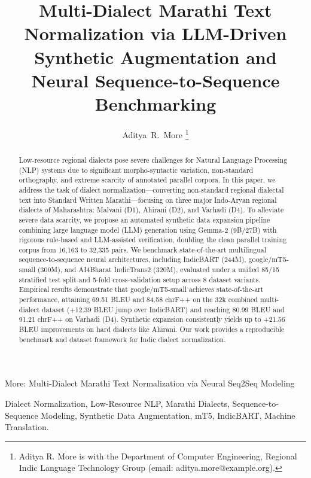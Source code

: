 \documentclass[journal,twocolumn]{IEEEtran}
\begin{document}
\title{Multi-Dialect Marathi Text Normalization via LLM-Driven Synthetic Augmentation and Neural Sequence-to-Sequence Benchmarking}

\author{Aditya~R.~More
\thanks{Aditya R. More is with the Department of Computer Engineering, Regional Indic Language Technology Group (email: aditya.more@example.org).}%
}

%
{More: Multi-Dialect Marathi Text Normalization via Neural Seq2Seq Modeling}

\maketitle

\begin{abstract}
Low-resource regional dialects pose severe challenges for Natural Language Processing (NLP) systems due to significant morpho-syntactic variation, non-standard orthography, and extreme scarcity of annotated parallel corpora. In this paper, we address the task of dialect normalization—converting non-standard regional dialectal text into Standard Written Marathi—focusing on three major Indo-Aryan regional dialects of Maharashtra: Malvani (D1), Ahirani (D2), and Varhadi (D4). To alleviate severe data scarcity, we propose an automated synthetic data expansion pipeline combining large language model (LLM) generation using Gemma-2 (9B/27B) with rigorous rule-based and LLM-assisted verification, doubling the clean parallel training corpus from 16,163 to 32,335 pairs. We benchmark state-of-the-art multilingual sequence-to-sequence neural architectures, including IndicBART (244M), google/mT5-small (300M), and AI4Bharat IndicTrans2 (320M), evaluated under a unified 85/15 stratified test split and 5-fold cross-validation setup across 8 dataset variants. Empirical results demonstrate that google/mT5-small achieves state-of-the-art performance, attaining 69.51 BLEU and 84.58 chrF++ on the 32k combined multi-dialect dataset (+12.39 BLEU jump over IndicBART) and reaching 80.99 BLEU and 91.21 chrF++ on Varhadi (D4). Synthetic expansion consistently yields up to +21.56 BLEU improvements on hard dialects like Ahirani. Our work provides a reproducible benchmark and dataset framework for Indic dialect normalization.
\end{abstract}

\begin{IEEEkeywords}
Dialect Normalization, Low-Resource NLP, Marathi Dialects, Sequence-to-Sequence Modeling, Synthetic Data Augmentation, mT5, IndicBART, Machine Translation.
\end{IEEEkeywords}
\end{document}

